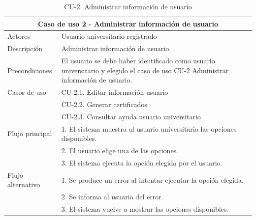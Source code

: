 \begin{table}[H]
        \caption{CU-2. Administrar información de usuario}
        \label{tab:CU-2}
        \begin{center}
            \begin{tabular}{|l|p{12cm}|}
                \hline
                \multicolumn{2}{|c|}{Caso de uso 2 - Administrar información de usuario} \\ \hline \hline
                Actores                 &   Usuario universitario registrado        \\  \hline
                Descripción             &   Administrar información de usuario. \\  \hline
                Precondiciones          &   El usuario se debe haber identificado como usuario universitario y elegido el caso de uso CU-2 Administrar información de usuario.  \\  \hline
                Casos de uso            &  CU-2.1. Editar información usuario\\ 
                &
                CU-2.2. Generar certificados\\ 
                &
                CU-2.3. Consultar ayuda usuario universitario \\
                \hline
                Flujo principal     &    1. El sistema muestra al usuario universitario las opciones disponibles.\\ 
                &   2. El usuario elige una de las opciones.\\ 
                &   3. El sistema ejecuta la opción elegida por el usuario.\\ 
                \hline
                Flujo alternativo    &  1. Se produce un error al intentar ejecutar la opción elegida. \\ 
                &  2. Se informa al usuario del error.  \\  
                &  3. El sistema vuelve a mostrar las opciones disponibles.  \\
                \hline
            \end{tabular}
        \end{center}
    \end{table}


